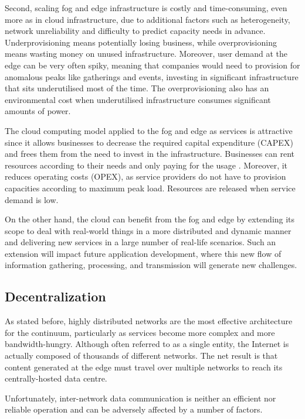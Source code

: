 \documentclass{ieeeaccess}
\begin{document}
Second, scaling fog and edge infrastructure is costly and time-consuming, even more as in cloud infrastructure, due to additional factors such as heterogeneity, network unreliability and difficulty to predict capacity needs in advance. Underprovisioning means potentially losing business, while overprovisioning means wasting money on unused infrastructure.  Moreover, user demand at the edge can be very often spiky, meaning that companies would need to provision for anomalous peaks like gatherings and events, investing in significant infrastructure that sits underutilised most of the time. The overprovisioning also has an environmental cost when underutilised infrastructure consumes significant amounts of power.

The cloud computing model applied to the fog and edge as services is attractive since it allows businesses to decrease the required capital expenditure (CAPEX) and frees them from the need to invest in the infrastructure. Businesses can rent resources according to their needs and only paying for the usage \cite{cloud-iot}. Moreover, it reduces operating costs (OPEX), as service providers do not have to provision capacities according to maximum peak load. Resources are released when service demand is low.

On the other hand, the cloud can benefit from the fog and edge by extending its scope to deal with real-world things in a more distributed and dynamic manner and delivering new services in a large number of real-life scenarios. Such an extension will impact future application development, where this new flow of information gathering, processing, and transmission will generate new challenges.

\subsection{Decentralization}

As stated before, highly distributed networks are the most effective architecture for the continuum, particularly as services become more complex and more bandwidth-hungry. Although often referred to as a single entity, the Internet is actually composed of thousands of different networks. The net result is that content generated at the edge must travel over multiple networks to reach its centrally-hosted data centre.

Unfortunately, inter-network data communication is neither an efficient nor reliable operation and can be adversely affected by a number of factors.
\end{document}
